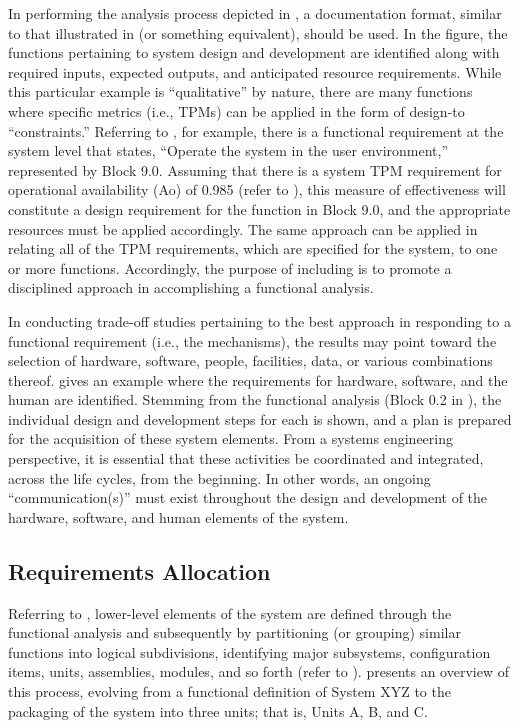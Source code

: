 In performing the analysis process depicted in , a documentation format, similar to that illustrated in (or something equivalent), should be used. In the figure, the functions pertaining to system design and development are identified along with required inputs, expected outputs, and anticipated resource requirements. While this particular example is ``qualitative'' by nature, there are many functions where specific metrics (i.e., TPMs) can be applied in the form of design-to ``constraints.'' Referring to , for example, there is a functional requirement at the system level that states, ``Operate the system in the user environment,'' represented by Block 9.0. Assuming that there is a system TPM requirement for operational availability (Ao) of 0.985 (refer to ), this measure of effectiveness will constitute a design requirement for the function in Block 9.0, and the appropriate resources must be applied accordingly. The same approach can be applied in relating all of the TPM requirements, which are specified for the system, to one or more functions. Accordingly, the purpose of including  is to promote a disciplined approach in accomplishing a functional analysis.

In conducting trade-off studies pertaining to the best approach in responding to a functional requirement (i.e., the mechanisms), the results may point toward the selection of hardware, software, people, facilities, data, or various combinations thereof. gives an example where the requirements for hardware, software, and the human are identified. Stemming from the functional analysis (Block 0.2 in ), the individual design and development steps for each is shown, and a plan is prepared for the acquisition of these system elements. From a systems engineering perspective, it is essential that these activities be coordinated and integrated, across the life cycles, from the beginning. In other words, an ongoing “communication(s)” must exist throughout the design and development of the hardware, software, and human elements of the system.

\subsection{Requirements Allocation}

Referring to , lower-level elements of the system are defined through the functional analysis and subsequently by partitioning (or grouping) similar functions into logical subdivisions, identifying major subsystems, configuration items, units, assemblies, modules, and so forth (refer to ). presents an overview of this process, evolving from a functional definition of System XYZ to the packaging of the system into three units; that is, Units A, B, and C.

